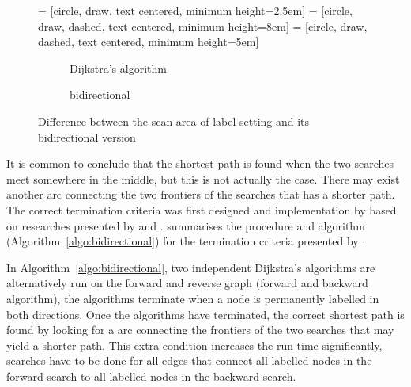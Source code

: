 \begin{figure}[H]
     = [circle, draw, text centered, minimum height=2.5em]
     = [circle, draw, dashed, text centered, minimum height=8em]
     = [circle, draw, dashed, text centered, minimum height=5em]
    \centering
    \begin{subfigure}[t]{.4\textwidth}
        \centering
        \caption{Dijkstra's algorithm}
    \end{subfigure}
    \begin{subfigure}[t]{.4\textwidth}
        \centering
        \caption{bidirectional}
    \end{subfigure}
    \caption{Difference between the scan area of label setting and its bidirectional version}
    \label{fig:bidirect}
\end{figure}

It is common to conclude that the shortest path is found when the two searches meet somewhere in the middle,
but this is not actually the case.
There may exist another arc connecting the two frontiers of the searches that has a shorter path.
The correct termination criteria was first designed and implementation by \citet{Pohl} based on researches presented by \citet{Dantzig, Nicholson} and \citet{Dreyfus}.
\citet{Klunder} summarises the procedure and algorithm (Algorithm~\ref{algo:bidirectional}) for the termination criteria presented by \citet{Pohl}.

In Algorithm~\ref{algo:bidirectional},
two independent Dijkstra's algorithms are alternatively run on the forward  and reverse graph (forward and backward algorithm),
the algorithms terminate when a node is permanently labelled in both directions.
Once the algorithms have terminated,
the correct shortest path is found by looking for a arc connecting the frontiers of the two searches that may yield a shorter path.
This extra condition increases the run time significantly, 
searches have to be done for all edges that connect all labelled nodes in the forward search to all labelled nodes in the backward search.

